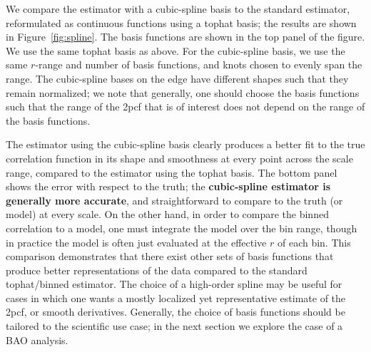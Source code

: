 \documentclass[modern]{aastex62}
\newcommand{\cf}{2pcf\xspace}
\newcommand{\new}[1]{\textbf{#1}}
\begin{document}
We compare the estimator with a cubic-spline basis to the standard estimator, reformulated as continuous functions using a tophat basis; the results are shown in Figure~\ref{fig:spline}.
The basis functions are shown in the top panel of the figure.
We use the same tophat basis as above.
For the cubic-spline basis, we use the same $r$-range and number of basis functions, and knots chosen to evenly span the range. 
The cubic-spline bases on the edge have different shapes such that they remain normalized; we note that generally, one should choose the basis functions such that the range of the \cf that is of interest does not depend on the range of the basis functions.

The estimator using the cubic-spline basis clearly produces a better fit to the true correlation function in its shape and smoothness at every point across the scale range, compared to the estimator using the tophat basis.
The bottom panel shows the error with respect to the truth; the \new{cubic-spline estimator is generally more accurate}, and straightforward to compare to the truth (or model) at every scale.
On the other hand, in order to compare the binned correlation to a model, one must integrate the model over the bin range, though in practice the model is often just evaluated at the effective $r$ of each bin.
This comparison demonstrates that there exist other sets of basis functions that produce better representations of the data compared to the standard tophat/binned estimator.
The choice of a high-order spline may be useful for cases in which one wants a mostly localized yet representative estimate of the \cf, or smooth derivatives.
Generally, the choice of basis functions should be tailored to the scientific use case; in the next section we explore the case of a BAO analysis.
\end{document}
